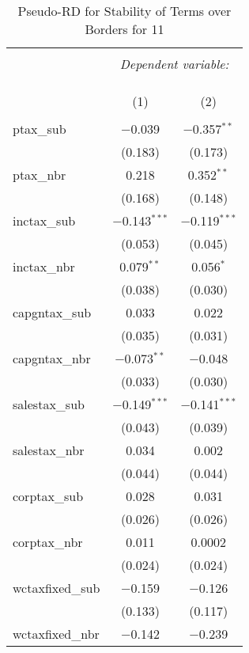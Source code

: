 
\begin{table}[!htbp] \centering 
  \caption{Pseudo-RD for Stability of Terms over Borders for  11} 
  \label{} 
\begin{tabular}{@{\extracolsep{5pt}}lcc} 
\\[-1.8ex]\hline 
\hline \\[-1.8ex] 
 & \multicolumn{2}{c}{\textit{Dependent variable:}} \\ 
\cline{2-3} 
\\[-1.8ex] & \multicolumn{2}{c}{ } \\ 
\\[-1.8ex] & (1) & (2)\\ 
\hline \\[-1.8ex] 
 ptax\_sub & $-$0.039 & $-$0.357$^{**}$ \\ 
  & (0.183) & (0.173) \\ 
  ptax\_nbr & 0.218 & 0.352$^{**}$ \\ 
  & (0.168) & (0.148) \\ 
  inctax\_sub & $-$0.143$^{***}$ & $-$0.119$^{***}$ \\ 
  & (0.053) & (0.045) \\ 
  inctax\_nbr & 0.079$^{**}$ & 0.056$^{*}$ \\ 
  & (0.038) & (0.030) \\ 
  capgntax\_sub & 0.033 & 0.022 \\ 
  & (0.035) & (0.031) \\ 
  capgntax\_nbr & $-$0.073$^{**}$ & $-$0.048 \\ 
  & (0.033) & (0.030) \\ 
  salestax\_sub & $-$0.149$^{***}$ & $-$0.141$^{***}$ \\ 
  & (0.043) & (0.039) \\ 
  salestax\_nbr & 0.034 & 0.002 \\ 
  & (0.044) & (0.044) \\ 
  corptax\_sub & 0.028 & 0.031 \\ 
  & (0.026) & (0.026) \\ 
  corptax\_nbr & 0.011 & 0.0002 \\ 
  & (0.024) & (0.024) \\ 
  wctaxfixed\_sub & $-$0.159 & $-$0.126 \\ 
  & (0.133) & (0.117) \\ 
  wctaxfixed\_nbr & $-$0.142 & $-$0.239 \\ 

\end{tabular}
\end{table}

